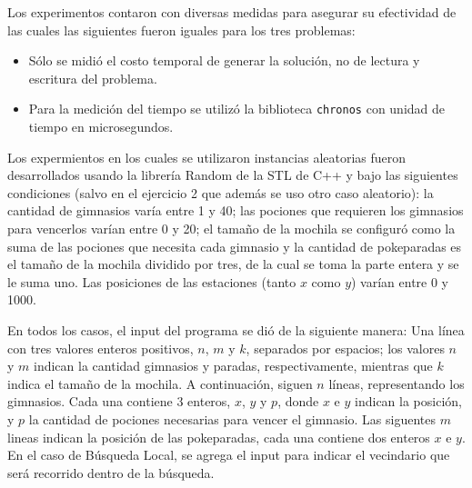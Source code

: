 Los experimentos contaron con diversas medidas para asegurar su efectividad de
las cuales las siguientes fueron iguales para los tres problemas:
\begin{itemize}
	\item{Sólo se midió el costo temporal de generar la solución, no
			de lectura y escritura del problema.}
	\item{Para la medición del tiempo se utilizó la biblioteca \texttt{chronos}
			con unidad de tiempo en microsegundos.}
\end{itemize}

Los expermientos en los cuales se utilizaron instancias aleatorias fueron desarrollados usando la librería Random de la STL de C++ y bajo las siguientes condiciones (salvo en el ejercicio 2 que además se uso otro caso aleatorio): la cantidad de gimnasios varía entre 1 y 40; las pociones que requieren los gimnasios para vencerlos varían entre 0 y 20; el tamaño de la mochila se configuró como la suma de las pociones que necesita cada gimnasio y la cantidad de pokeparadas es el tamaño de la mochila dividido por tres, de la cual se toma la parte entera y se le suma uno. Las posiciones de las estaciones (tanto $x$ como $y$) varían entre 0 y 1000.


En todos los casos, el input del programa se dió de la siguiente manera:
Una línea con tres valores enteros positivos, $n$, $m$ y $k$, separados por espacios; los valores $n$ y $m$ indican la cantidad gimnasios y paradas, respectivamente, mientras que $k$ indica el tamaño de la mochila. A continuación, siguen $n$ líneas, representando los gimnasios. Cada una contiene 3 enteros, $x$, $y$ y $p$, donde $x$ e $y$ indican la posición, y $p$ la cantidad de pociones necesarias para vencer el gimnasio. Las siguentes $m$ lineas indican la posición de las pokeparadas, cada una contiene dos enteros $x$ e $y$. En el caso de Búsqueda Local, se agrega el input para indicar el vecindario que será recorrido dentro de la búsqueda.